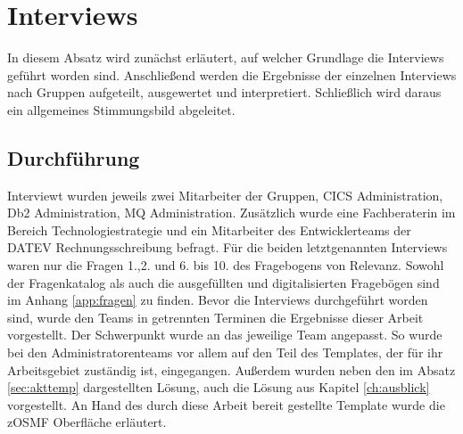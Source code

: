 \section{Interviews}
In diesem Absatz wird zunächst erläutert, auf welcher Grundlage die Interviews geführt worden sind.
Anschließend werden die Ergebnisse der einzelnen Interviews nach Gruppen aufgeteilt, ausgewertet und interpretiert.
Schließlich wird daraus ein allgemeines Stimmungsbild abgeleitet.

\subsection{Durchführung}
Interviewt wurden jeweils zwei Mitarbeiter der Gruppen, CICS Administration, Db2 Administration, MQ Administration.
Zusätzlich wurde eine Fachberaterin im Bereich Technologiestrategie und ein Mitarbeiter des Entwicklerteams der DATEV Rechnungsschreibung befragt.
Für die beiden letztgenannten Interviews waren nur die Fragen 1.,2. und 6. bis 10. des Fragebogens von Relevanz.
Sowohl der Fragenkatalog als auch die ausgefüllten und digitalisierten Fragebögen sind im Anhang \ref{app:fragen} zu finden.
Bevor die Interviews durchgeführt worden sind, wurde den Teams in getrennten Terminen die Ergebnisse dieser Arbeit vorgestellt.
Der Schwerpunkt wurde an das jeweilige Team angepasst.
So wurde bei den Administratorenteams vor allem auf den Teil des Templates, der für ihr Arbeitsgebiet zuständig ist, eingegangen.
Außerdem wurden neben den im Absatz \ref{sec:akttemp} dargestellten Lösung, auch die Lösung aus Kapitel \ref{ch:ausblick} vorgestellt.
An Hand des durch diese Arbeit bereit gestellte Template wurde die zOSMF Oberfläche erläutert.

